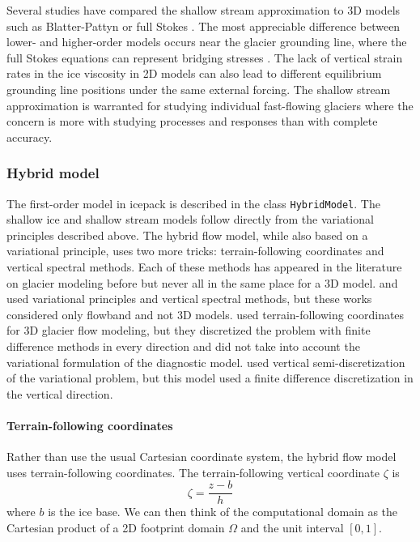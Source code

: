 \documentclass{article}
\theoremstyle{definition}
\theoremstyle{plain}
\begin{document}
Several studies have compared the shallow stream approximation to 3D models such as Blatter-Pattyn or full Stokes \citep{pattyn2013grounding}.
The most appreciable difference between lower- and higher-order models occurs near the glacier grounding line, where the full Stokes equations can represent bridging stresses \citep{van2013fundamentals}.
The lack of vertical strain rates in the ice viscosity in 2D models can also lead to different equilibrium grounding line positions under the same external forcing.
The shallow stream approximation is warranted for studying individual fast-flowing glaciers where the concern is more with studying processes and responses than with complete accuracy.


\subsubsection{Hybrid model} \label{sec:physics-hybrid-model}

The first-order model in icepack is described in the class \texttt{HybridModel}.
The shallow ice and shallow stream models follow directly from the variational principles described above.
The hybrid flow model, while also based on a variational principle, uses two more tricks: terrain-following coordinates and vertical spectral methods.
Each of these methods has appeared in the literature on glacier modeling before but never all in the same place for a 3D model.
\citet{langdon1978numerical} and \cite{bassis2010hamilton} used variational principles and vertical spectral methods, but these works considered only flowband and not 3D models.
\citet{kleiner2014numerical} used terrain-following coordinates for 3D glacier flow modeling, but they discretized the problem with finite difference methods in every direction and did not take into account the variational formulation of the diagnostic model.
\citet{jouvet2015multilayer} used vertical semi-discretization of the variational problem, but this model used a finite difference discretization in the vertical direction.

\paragraph{Terrain-following coordinates}

Rather than use the usual Cartesian coordinate system, the hybrid flow model uses terrain-following coordinates.
The terrain-following vertical coordinate $\zeta$ is
\begin{equation}
    \zeta = \frac{z - b}{h}
\end{equation}
where $b$ is the ice base.
We can then think of the computational domain as the Cartesian product of a 2D footprint domain $\Omega$ and the unit interval $[0, 1]$.
\end{document}
